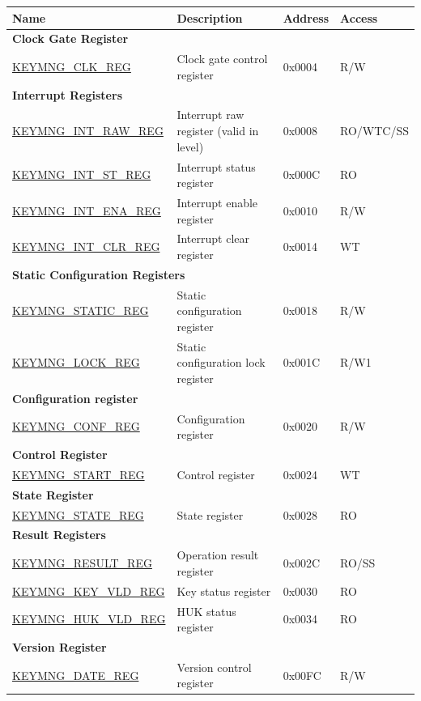 \begin{longtable}{ | p{6cm} | p{6.4cm} | p{1.3cm} | p{1.8cm} | }
\hline\rowcolor{lightgray}
\textbf{Name} & \textbf{Description} &  \textbf{Address} & \textbf{Access} \\ \hline
\endhead
\multicolumn{4}{|l|}{\textbf{Clock Gate Register}} \\ \hline
\hyperref[regdesc:KEYMNGCLKREG]{KEYMNG\_CLK\_REG} & Clock gate control register & 0x0004 & R/W \\ \hline
\multicolumn{4}{|l|}{\textbf{Interrupt Registers}} \\ \hline
\hyperref[regdesc:KEYMNGINTRAWREG]{KEYMNG\_INT\_RAW\_REG} & Interrupt raw register (valid in level) & 0x0008 & RO/WTC/SS \\ \hline
\hyperref[regdesc:KEYMNGINTSTREG]{KEYMNG\_INT\_ST\_REG} & Interrupt status register & 0x000C & RO \\ \hline
\hyperref[regdesc:KEYMNGINTENAREG]{KEYMNG\_INT\_ENA\_REG} & Interrupt enable register & 0x0010 & R/W \\ \hline
\hyperref[regdesc:KEYMNGINTCLRREG]{KEYMNG\_INT\_CLR\_REG} & Interrupt clear register & 0x0014 & WT \\ \hline
\multicolumn{4}{|l|}{\textbf{Static Configuration Registers}} \\ \hline
\hyperref[regdesc:KEYMNGSTATICREG]{KEYMNG\_STATIC\_REG} & Static configuration register & 0x0018 & R/W \\ \hline
\hyperref[regdesc:KEYMNGLOCKREG]{KEYMNG\_LOCK\_REG} & Static configuration lock register & 0x001C & R/W1 \\ \hline
\multicolumn{4}{|l|}{\textbf{Configuration register}} \\ \hline
\hyperref[regdesc:KEYMNGCONFREG]{KEYMNG\_CONF\_REG} & Configuration register & 0x0020 & R/W \\ \hline
\multicolumn{4}{|l|}{\textbf{Control Register}} \\ \hline
\hyperref[regdesc:KEYMNGSTARTREG]{KEYMNG\_START\_REG} & Control register & 0x0024 & WT \\ \hline
\multicolumn{4}{|l|}{\textbf{State Register}} \\ \hline
\hyperref[regdesc:KEYMNGSTATEREG]{KEYMNG\_STATE\_REG} & State register & 0x0028 & RO \\ \hline
\multicolumn{4}{|l|}{\textbf{Result Registers}} \\ \hline
\hyperref[regdesc:KEYMNGRESULTREG]{KEYMNG\_RESULT\_REG} & Operation result register & 0x002C & RO/SS \\ \hline
\hyperref[regdesc:KEYMNGKEYVLDREG]{KEYMNG\_KEY\_VLD\_REG} & Key status register & 0x0030 & RO \\ \hline
\hyperref[regdesc:KEYMNGHUKVLDREG]{KEYMNG\_HUK\_VLD\_REG} & HUK status register & 0x0034 & RO \\ \hline
\multicolumn{4}{|l|}{\textbf{Version Register}} \\ \hline
\hyperref[regdesc:KEYMNGDATEREG]{KEYMNG\_DATE\_REG} & Version control register & 0x00FC & R/W \\ \hline
\end{longtable}